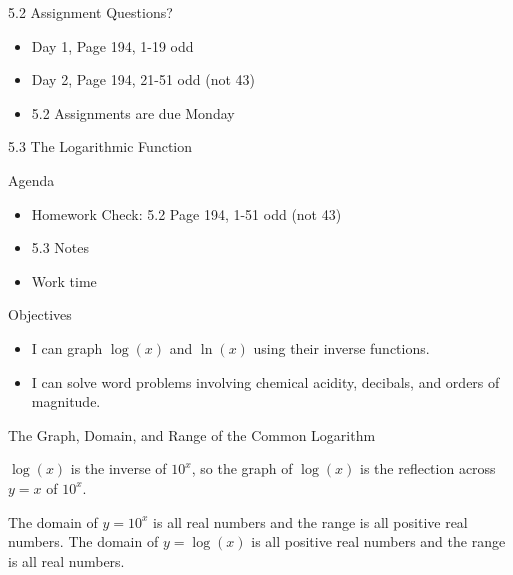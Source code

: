 \documentclass[ignorenonframetext,]{beamer}
\providecommand{\tightlist}{%
  \setlength{\itemsep}{0pt}\setlength{\parskip}{0pt}}
\begin{document}
\begin{frame}{5.2 Assignment Questions?}

\begin{itemize}
\tightlist
\item
  Day 1, Page 194, 1-19 odd
\item
  Day 2, Page 194, 21-51 odd (not 43)
\item
  5.2 Assignments are due Monday
\end{itemize}

\end{frame}

\begin{frame}{5.3 The Logarithmic Function}

\begin{block}{Agenda}

\begin{itemize}
\tightlist
\item
  Homework Check: 5.2 Page 194, 1-51 odd (not 43)
\item
  5.3 Notes
\item
  Work time
\end{itemize}

\end{block}

\begin{block}{Objectives}

\begin{itemize}
\tightlist
\item
  I can graph \(\log(x)\) and \(\ln(x)\) using their inverse functions.
\item
  I can solve word problems involving chemical acidity, decibals, and
  orders of magnitude.
\end{itemize}

\end{block}

\end{frame}

\begin{frame}{The Graph, Domain, and Range of the Common Logarithm}

\(\log(x)\) is the inverse of \(10^x\), so the graph of \(\log(x)\) is
the reflection across \(y = x\) of \(10^x\).


The domain of \(y = 10^x\) is all real numbers and the range is all
positive real numbers. The domain of \(y = \log(x)\) is all positive
real numbers and the range is all real numbers.

\end{frame}
\end{document}
